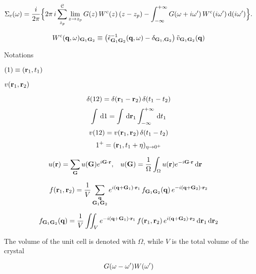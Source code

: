 \documentclass[a4paper,reqno,11pt,twoside]{book}
\begin{document}
\begin{multline}
\label{eq:GW_CD}
\Sigma_c(\omega) = \dfrac{i}{{2\pi}} \Bigl\{ 
 {2\pi}\,i \sum_{z_p}^{\mathcal{C}} \lim_{z{\rightarrow} z_p} G(z)\,{W}^\text{c}(z)\,(z-z_p) -\int_{-\infty}^{+\infty} G(\omega+i\omega')\,{W}^\text{c}(i\omega') {\,\text{d}}(i\omega')
 \Bigr\}.
\end{multline}

\begin{equation}
{W}^\text{c}({\bf q},\omega)_{{\bf G}_1{\bf G}_2} \equiv 
\bigl(\tilde\epsilon^{-1}_{{\bf G}_1{\bf G}_2}({\bf q},\omega) -\delta_{{\bf G}_1,{\bf G}_2}\bigr)
\,{{\tilde{v}}}_{{\bf G}_1{\bf G}_2}({\bf q})
\end{equation}


Notations

$(1) \equiv ({\bf r}_1,t_1)$ 

${v}({\bf r}_1,{\bf r}_2)$ 

\begin{equation}
\delta(12) = \delta({\bf r}_1-{\bf r}_2)\,\delta(t_1-t_2)
\end{equation}
%
\begin{equation}
\int {\,\text{d}}1 = \int {{\,\text{d}}{\bf r}}_1 \int_{-\infty}^{+\infty} {\,\text{d}} t_1
\end{equation}
%
\begin{equation}
v(12)= {v}({\bf r}_1,{\bf r}_2)\,\delta(t_1-t_2)
\end{equation}
%
\begin{equation}
1^+ = ({\bf r}_1,t_1 + \eta)_{\eta  {\rightarrow} 0^+}
\end{equation}

\begin{alignat}{2}\label{eq:FT_1point_convention}
 u({\bf r})= \sum_{\bf G} u({\bf G})e^{i{\bf G}\cdot{\bf r}}, &\quad
 u({\bf G}) = \frac{1}{\Omega} \int_\Omega u({\bf r})e^{-i{\bf G}\cdot{\bf r}}{\,\text{d}}{\bf r}
\end{alignat}


\begin{equation}\label{eq:IFT_2points_convention}
 f({\bf r}_1,{\bf r}_2)= \frac{1}{V} \sum_{\substack{{\bf q} \\ {\bf G}_1 {\bf G}_2}}  
 e^{i ({\bf q} +{\bf G}_1) \cdot {\bf r}_1}\,f_{{\bf G}_1 {\bf G}_2}({\bf q})\,e^{-i ({\bf q}+{\bf G}_2) \cdot {\bf r}_2} 
\end{equation}

\begin{equation}\label{eq:FT_2points_convention}
 f_{{\bf G}_1{\bf G}_2}({\bf q}) = \frac{1}{V} \iint_V                                                     
 e^{-i({\bf q}+{\bf G}_1) \cdot {\bf r}_1}\,f({\bf r}_1, {\bf r}_2)\,e^{i ({\bf q}+{\bf G}_2) \cdot {\bf r}_2}{\,\text{d}}{\bf r}_1{\,\text{d}}{\bf r}_2 
\end{equation}

The volume of the unit cell is denoted with $\Omega$, while $V$ is the total volume of the crystal 

\begin{equation}\label{eq:Poles of G and W}
 G(\omega-\omega')  
 W(\omega')
\end{equation}
\end{document}
